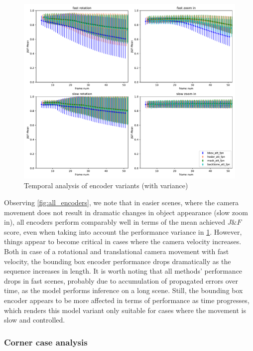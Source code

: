 \begin{figure} [ht!]
    \centering
    \includegraphics[width=1.\linewidth]{figures/04_experiments/encoder_ablations/bbox_att_fpn-hodor_att_fpn-mask_att_fpn-backbone_att_fpn-movement_all_variance.pdf}
    \caption{Temporal analysis of encoder variants (with variance)}
    \label{fig:all_encoders_var}
    
\end{figure}

Observing \figref\ref{fig:all_encoders}, we note that in easier scenes, where the camera movement does not result in dramatic changes in object appearance (slow zoom in), all encoders perform comparably well in terms of the mean achieved $J\&F$ score, even when taking into account the performance variance in \figref\ref{fig:all_encoders_var}. However, things appear to become critical in cases where the camera velocity increases. Both in case of a rotational and translational camera movement with fast velocity, the bounding box encoder performance drops dramatically as the sequence increases in length. It is worth noting that all methods' performance drops in fast scenes, probably due to accumulation of propagated errors over time, as the model performs inference on a long scene. Still, the bounding box encoder appears to be more affected in terms of performance as time progresses, which renders this model variant only suitable for cases where the movement is slow and controlled. \par

\subsubsection{Corner case analysis}

